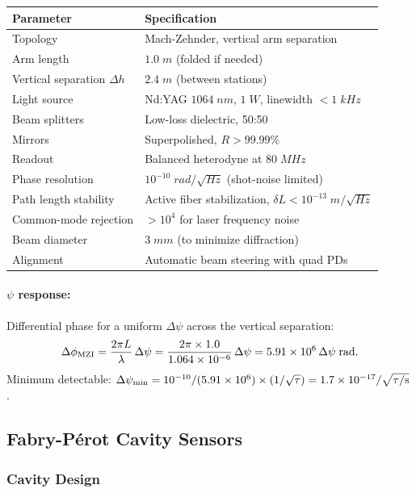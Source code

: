 \documentclass[11pt,a4paper]{article}
\begin{document}
\begin{longtable}{p{}p{}}
\toprule
\textbf{Parameter} & \textbf{Specification} \\
\midrule
\endhead
Topology & Mach-Zehnder, vertical arm separation \\
Arm length & $1.0\;\si{m}$ (folded if needed) \\
Vertical separation $\Delta h$ & $2.4\;\si{m}$ (between stations) \\
Light source & Nd:YAG $1064\;\si{nm}$, $1\;\si{W}$,
linewidth $< 1\;\si{kHz}$ \\
Beam splitters & Low-loss dielectric, 50:50 \\
Mirrors & Superpolished, $R > 99.99\%$ \\
Readout & Balanced heterodyne at $80\;\si{MHz}$ \\
Phase resolution & $10^{-10}\;\si{rad/\sqrt{Hz}}$ (shot-noise limited) \\
Path length stability & Active fiber stabilization,
$\delta L < 10^{-13}\;\si{m/\sqrt{Hz}}$ \\
Common-mode rejection & $> 10^4$ for laser frequency noise \\
Beam diameter & $3\;\si{mm}$ (to minimize diffraction) \\
Alignment & Automatic beam steering with quad PDs \\
\bottomrule
\end{longtable}

\paragraph{$\psi$ response:}
Differential phase for a uniform $\Delta\psi$ across the
vertical separation:
\begin{equation}
\Delta\phi_{\rm MZI} = \frac{2\pi L}{\lambda}\,\Delta\psi
= \frac{2\pi \times 1.0}{1.064 \times 10^{-6}}\,\Delta\psi
= 5.91 \times 10^6\,\Delta\psi \;\si{rad}.
\end{equation}
Minimum detectable: $\Delta\psi_{\rm min} = 10^{-10}/(5.91 \times 10^6)
\times (1/\sqrt{\tau}) = 1.7 \times 10^{-17}/\sqrt{\tau/\si{s}}$.

\subsection{Fabry-P\'erot Cavity Sensors}

\subsubsection{Cavity Design}
\end{document}
